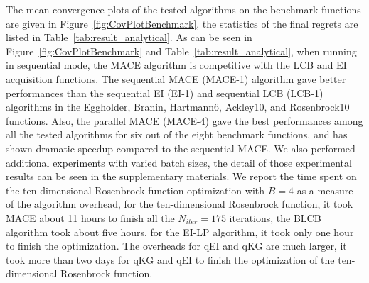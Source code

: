 The mean convergence plots of the tested algorithms on the benchmark functions
are given in Figure~\ref{fig:CovPlotBenchmark}, the statistics of the final
regrets are listed in Table~\ref{tab:result_analytical}. As can be seen in
Figure~\ref{fig:CovPlotBenchmark} and Table~\ref{tab:result_analytical}, when
running in sequential mode, the MACE algorithm is competitive with the LCB and
EI acquisition functions. The sequential MACE (MACE-1) algorithm gave better
performances than the sequential EI (EI-1) and sequential LCB (LCB-1)
algorithms in the Eggholder, Branin, Hartmann6, Ackley10, and Rosenbrock10
functions. Also, the parallel MACE (MACE-4) gave the best performances among
all the tested algorithms for six out of the eight benchmark functions, and has
shown dramatic speedup compared to the sequential MACE. We also performed
additional experiments with varied batch sizes, the detail of those
experimental results can be seen in the supplementary materials. We report the
time spent on the ten-dimensional Rosenbrock function optimization with $B = 4$ as a measure
of the algorithm overhead, for the ten-dimensional Rosenbrock function, it took
MACE about 11 hours to finish all the $N_{iter} = 175$ iterations, the BLCB algorithm took about
five hours, for the EI-LP algorithm, it took only one hour to finish the optimization. The overheads for qEI and qKG are much larger, it took
more than two days for qKG and qEI to finish the optimization of the ten-dimensional Rosenbrock function.

